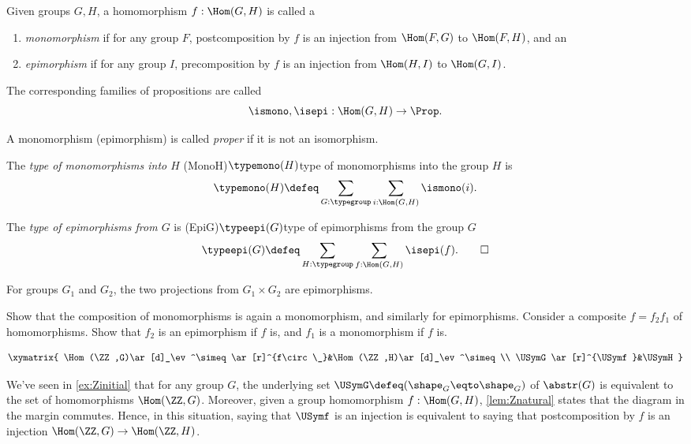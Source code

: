 \begin{definition}\label{def:monomorphism}
Given groups $G,H$, a homomorphism $f: \Hom(G,H)$ is called a
\label{def:epimorphism}
\begin{enumerate}
\item \emph{monomorphism} if for any group $F$,
  postcomposition by $f$ is an injection from $\Hom(F,G)$ to $\Hom(F,H)$, and an
\item \emph{epimorphism} if for any group $I$,
  precomposition by $f$ is an injection from $\Hom(H,I)$ to $\Hom(G,I)$.
\end{enumerate}
The corresponding families of propositions are called
\[
  \ismono,\isepi:\Hom(G,H)\to\Prop.
\]

A monomorphism (epimorphism) is called \emph{proper}
%
if it is not an isomorphism.

The \emph{type of monomorphisms into $H$}
%
  \glossary(MonoH){$\protect{\typemono(H)}$}{type of monomorphisms%
  into the group $H$}%
  is
  \[
  \typemono(H)\defeq\sum_{G:\typegroup}\sum_{i:\Hom(G,H)}\ismono(i).
  \] 


The \emph{type of epimorphisms from $G$} is
%
\glossary(EpiG){$\protect{\typeepi(G)}$}{type of epimorphisms from the group $G$}%
  \[
  \typeepi(G)\defeq\sum_{H:\typegroup}\sum_{f:\Hom(G,H)}\isepi(f).\qedhere
  \]
\end{definition}

\begin{example}\label{exa:projections-epi}
For groups $G_1$ and $G_2$, the two projections from $G_1\times G_2$ 
are epimorphisms.
\end{example}

\begin{exercise}\label{xca:mono1st-epi2nd}
Show that the composition of monomorphisms is again a monomorphism,
and similarly for epimorphisms.
Consider a composite $f=f_2f_1$ of homomorphisms.  Show that $f_2$ is an epimorphism if $f$ is, and $f_1$ is a monomorphism if $f$ is.
\end{exercise}
    

\begin{marginfigure}
$$\xymatrix{
\Hom(\ZZ,G)\ar[d]_\ev^\simeq\ar[r]^{f\circ\_}&\Hom(\ZZ,H)\ar[d]_\ev^\simeq\\
\USymG\ar[r]^{\USymf}&\USymH
}$$
\caption{\label{fig:Znatural}Naturality of $\protect\ev$.}
\end{marginfigure}
We've seen in \cref{ex:Zinitial} that for any group $G$, 
the underlying set $\USymG\defeq(\sh_G\eqto\sh_G)$ of $\abstr(G)$ is equivalent to the set of homomorphisms $\Hom(\ZZ,G)$. Moreover,
given a group homomorphism $f:\Hom(G,H)$, \cref{lem:Znatural} 
states that the diagram in the margin commutes.
Hence, in this situation, saying that
$\USymf$ is an injection is equivalent to saying that 
postcomposition by $f$ is an injection $\Hom(\ZZ,G)\to\Hom(\ZZ,H)$.

